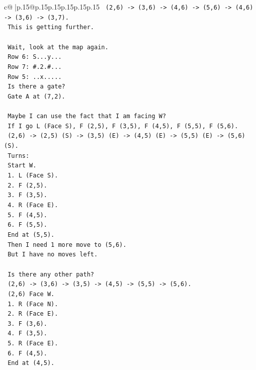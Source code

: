 \documentclass{article}
\begin{document}
{\begin{supertabular}{c@{$\;$}|p{.15\linewidth}@{}p{.15\linewidth}p{.15\linewidth}p{.15\linewidth}p{.15\linewidth}p{.15\linewidth}}
{{{\texttt{   (2,6) {-}> (3,6) {-}> (4,6) {-}> (5,6) {-}> (4,6) {-}> (3,6) {-}> (3,7).} \\
\texttt{   This is getting further.} \\
\\ 
\texttt{   Wait, look at the map again.} \\
\texttt{   Row 6: S...y...} \\
\texttt{   Row 7: \#.2.\#...} \\
\texttt{   Row 5: ..x.....} \\
\texttt{   Is there a gate?} \\
\texttt{   Gate A at (7,2).} \\
\\ 
\texttt{   Maybe I can use the fact that I am facing W?} \\
\texttt{   If I go L (Face S), F (2,5), F (3,5), F (4,5), F (5,5), F (5,6).} \\
\texttt{   (2,6) {-}> (2,5) (S) {-}> (3,5) (E) {-}> (4,5) (E) {-}> (5,5) (E) {-}> (5,6) (S).} \\
\texttt{   Turns:} \\
\texttt{   Start W.} \\
\texttt{   1. L (Face S).} \\
\texttt{   2. F (2,5).} \\
\texttt{   3. F (3,5).} \\
\texttt{   4. R (Face E).} \\
\texttt{   5. F (4,5).} \\
\texttt{   6. F (5,5).} \\
\texttt{   End at (5,5).} \\
\texttt{   Then I need 1 more move to (5,6).} \\
\texttt{   But I have no moves left.} \\
\\ 
\texttt{   Is there any other path?} \\
\texttt{   (2,6) {-}> (3,6) {-}> (3,5) {-}> (4,5) {-}> (5,5) {-}> (5,6).} \\
\texttt{   (2,6) Face W.} \\
\texttt{   1. R (Face N).} \\
\texttt{   2. R (Face E).} \\
\texttt{   3. F (3,6).} \\
\texttt{   4. F (3,5).} \\
\texttt{   5. R (Face E).} \\
\texttt{   6. F (4,5).} \\
\texttt{   End at (4,5).} \\
}}}
\end{supertabular}}
\end{document}
